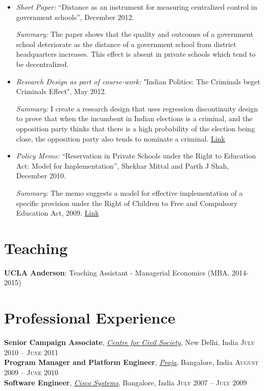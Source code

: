 \documentclass[11pt]{article}
\begin{document}
\begin{itemize}
\item \emph{Short Paper:} ``Distance as an instrument for measuring
centralized control in government schools'', December 2012.

\emph{Summary:} The paper shows that the quality and outcomes of a
government school deteriorate as the distance of a government school
from district headquarters increases. This effect is absent in
private schools which tend to be decentralized.

\item \emph{Research Design as part of course-work:} "Indian Politics: The
Criminals beget Criminals Effect", May 2012.

\emph{Summary:} I create a research design that uses regression
discontinuity design to prove that when the incumbent in Indian
elections is a criminal, and the opposition party thinks that there
is a high probability of the election being close, the opposition
party also tends to nominate a criminal.
\href{http://shekharmittal.info/papers/pe_researchdesign.pdf}{Link}
\end{itemize}


\begin{itemize}
\item \emph{Policy Memo:} ``Reservation in Private Schools under the Right
to Education Act: Model for Implementation'', Shekhar Mittal and
Parth J Shah, December 2010.

\emph{Summary:} The memo suggests a model for effective
implementation of a specific provision under the Right of Children
to Free and Compulsory Education Act, 2009. \href{http://shekharmittal.info/papers/viewpoint10.pdf}{Link}
\end{itemize}

\section{Teaching}
\label{sec-4}
\textbf{UCLA Anderson}: Teaching Assistant - Managerial Economics (MBA, 2014-2015)

\section{Professional Experience}
\label{sec-5}
\flushleft
\textbf{Senior Campaign Associate}, \emph{\href{http://ccs.in}{Centre for Civil Society}}, New Delhi,
India \hfill \textsc{\normalsize July 2010 -- June 2011}\\
\vspace{0.6em}
\textbf{Program Manager and Platform Engineer}, \emph{\href{http://praja.in}{Praja}}, Bangalore, India
 \hfill \textsc{\normalsize August 2009 -- June 2010}\\
\vspace{0.6em}
\textbf{Software Engineer}, \emph{\href{http://www.cisco.com}{Cisco Systems}}, Bangalore, India \hfill \textsc{\normalsize July 2007 -- July 2009}\\
\end{document}
